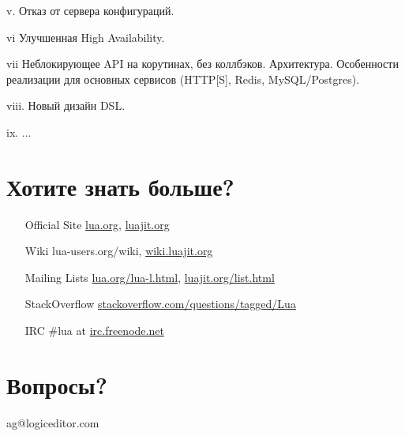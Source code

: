 \documentclass[aspectratio=169,handout,bigger]{beamer}
\begin{document}
\begin{frame}
v. Отказ от сервера конфигураций.
\end{frame}

\begin{frame}
vi Улучшенная High Availability.
\end{frame}

\begin{frame}
vii Неблокирующее API на корутинах, без коллбэков. Архитектура. Особенности реализации для основных сервисов (HTTP[S], Redis, MySQL/Postgres).
\end{frame}

\begin{frame}
viii. Новый дизайн DSL.
\end{frame}

\begin{frame}
ix. ...
\end{frame}


\section{Хотите знать больше?}

\begin{frame}
  \begin{center}
  \begin{minipage}{0.6\linewidth}
  \begin{itemize}
    \item[Official Site] \url{lua.org}, \url{luajit.org}
    \item[Wiki] lua-users.org/wiki, \url{wiki.luajit.org}
    \item[Mailing Lists] \url{lua.org/lua-l.html}, \url{luajit.org/list.html}
    \item[StackOverflow] \url{stackoverflow.com/questions/tagged/Lua}
    \item[IRC] \#lua at \url{irc.freenode.net}
  \end{itemize}
  \end{minipage}
  \end{center}
\end{frame}


\section*{Вопросы?}

\begin{frame}

\begin{center}
\Huge{ag@logiceditor.com}
\end{center}

\end{frame}

\end{document}
